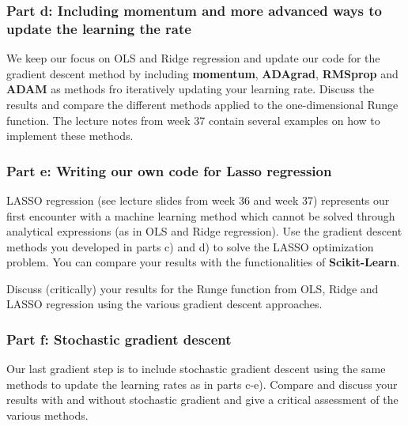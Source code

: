 \documentclass[11pt]{article}
\begin{document}
    \hypertarget{part-d-including-momentum-and-more-advanced-ways-to-update-the-learning-the-rate}{%
\subsubsection*{Part d: Including momentum and more advanced ways to
update the learning the
rate}\label{part-d-including-momentum-and-more-advanced-ways-to-update-the-learning-the-rate}}

We keep our focus on OLS and Ridge regression and update our code for
the gradient descent method by including \textbf{momentum},
\textbf{ADAgrad}, \textbf{RMSprop} and \textbf{ADAM} as methods fro
iteratively updating your learning rate. Discuss the results and compare
the different methods applied to the one-dimensional Runge function. The
lecture notes from week 37 contain several examples on how to implement
these methods.

    \hypertarget{part-e-writing-our-own-code-for-lasso-regression}{%
\subsubsection*{Part e: Writing our own code for Lasso
regression}\label{part-e-writing-our-own-code-for-lasso-regression}}

LASSO regression (see lecture slides from week 36 and week 37)
represents our first encounter with a machine learning method which
cannot be solved through analytical expressions (as in OLS and Ridge
regression). Use the gradient descent methods you developed in parts c)
and d) to solve the LASSO optimization problem. You can compare your
results with the functionalities of \textbf{Scikit-Learn}.

Discuss (critically) your results for the Runge function from OLS, Ridge
and LASSO regression using the various gradient descent approaches.

    \hypertarget{part-f-stochastic-gradient-descent}{%
\subsubsection*{Part f: Stochastic gradient
descent}\label{part-f-stochastic-gradient-descent}}

Our last gradient step is to include stochastic gradient descent using
the same methods to update the learning rates as in parts c-e). Compare
and discuss your results with and without stochastic gradient and give a
critical assessment of the various methods.
\end{document}
